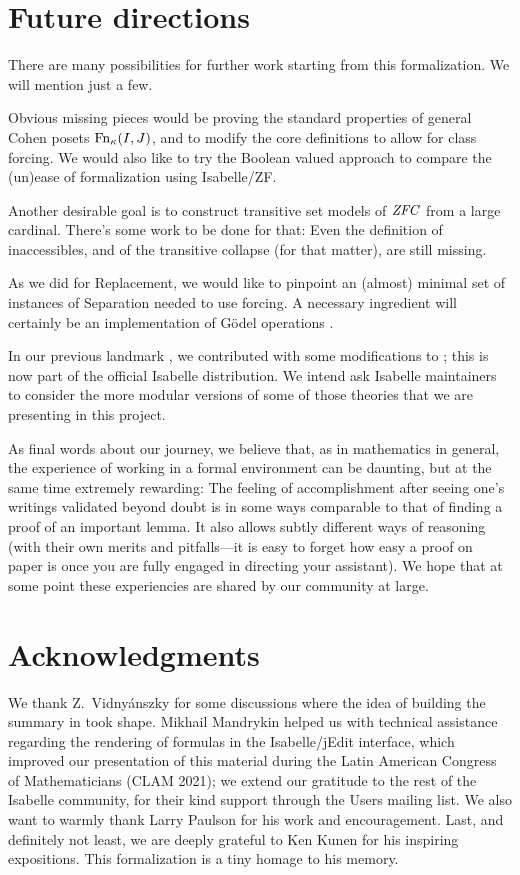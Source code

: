 \section{Future directions}
\label{sec:conclusion}

There are many possibilities for further work starting from this
formalization. We will mention just a few.

Obvious missing pieces would be proving the standard properties of
general Cohen posets $\operatorname{Fn}_\kappa(I,J)$, and to modify the core
definitions to allow for class forcing. We would also like to try the
Boolean valued approach to compare the (un)ease of formalization using
Isabelle/ZF.

Another desirable goal is to construct transitive set models of $\mathit{ZFC}$
from a large cardinal. There's some work to be done for that: Even the
definition of inaccessibles, and of the transitive collapse (for that
matter), are still missing.

As we did for Replacement, we would like to pinpoint an (almost)
minimal set of instances of
Separation needed to use forcing. A necessary ingredient will
certainly be an implementation of Gödel operations
\cite[Thm.~13.4]{Jech_Millennium}.

In our previous landmark \cite{2020arXiv200109715G}, we contributed
with some modifications to ; this is now
part of the official Isabelle distribution.  We intend ask Isabelle
maintainers to consider the more modular versions of some of those
theories that we are presenting in this project.

As final words about our journey, we believe that, as in mathematics
in general, the experience of working in a formal environment can be
daunting, but at the same time extremely rewarding: The feeling of
accomplishment after seeing one's writings validated beyond doubt is
in some ways comparable to that of finding a proof of an important
lemma. It also allows subtly different ways of reasoning (with their
own merits and pitfalls---it is easy to forget how easy a proof on
paper is once you are fully engaged in directing your assistant). We
hope that at some point these experiencies are shared by our community
at large.


\section*{Acknowledgments}
\label{sec:acknowledgments}
We thank Z.~Vidnyánszky for some discussions where the idea of
building the summary in  took shape.
Mikhail Mandrykin helped us with technical assistance regarding the
rendering of formulas in the Isabelle/jEdit interface, which improved
our presentation of this material during the Latin American Congress
of Mathematicians (CLAM 2021); we extend our gratitude to the rest of
the Isabelle community, for their kind support through the Users mailing
list. We also want to warmly thank Larry Paulson for his work and
encouragement.  Last, and definitely not least, we are deeply grateful
to Ken Kunen for his
inspiring expositions. This formalization is a tiny homage to his
memory.


